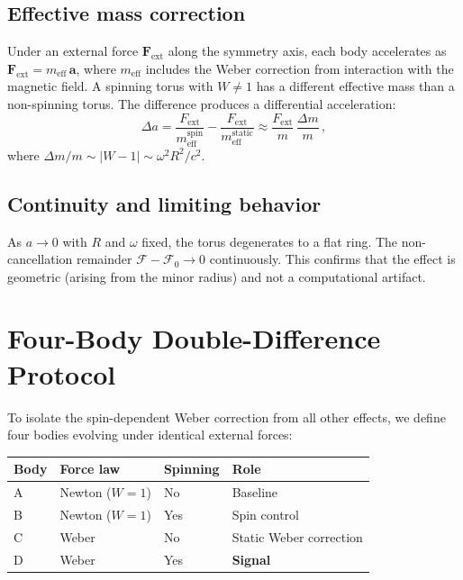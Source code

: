 \documentclass[12pt,preprint,amsmath,amssymb]{revtex4-2}
\begin{document}
\subsection{Effective mass correction}

Under an external force $\mathbf{F}_{\text{ext}}$ along the symmetry axis, each body
accelerates as $\mathbf{F}_{\text{ext}} = m_{\text{eff}}\,\mathbf{a}$, where
$m_{\text{eff}}$ includes the Weber correction from interaction with the magnetic field.
A spinning torus with $W \neq 1$ has a different effective mass than a non-spinning torus.
The difference produces a differential acceleration:
\begin{equation}
\label{eq:coupling}
\Delta a = \frac{F_{\text{ext}}}{m_{\text{eff}}^{\text{spin}}}
  - \frac{F_{\text{ext}}}{m_{\text{eff}}^{\text{static}}}
  \approx \frac{F_{\text{ext}}}{m}\,\frac{\Delta m}{m}\,,
\end{equation}
where $\Delta m / m \sim |W - 1| \sim \omega^2 R^2 / c^2$.

\subsection{Continuity and limiting behavior}

As $a \to 0$ with $R$ and $\omega$ fixed, the torus degenerates to a flat ring.
The non-cancellation remainder $\mathcal{F} - \mathcal{F}_0 \to 0$ continuously.
This confirms that the effect is geometric (arising from the minor radius) and not
a computational artifact.

\section{Four-Body Double-Difference Protocol}
\label{sec:protocol}

To isolate the spin-dependent Weber correction from all other effects, we define
four bodies evolving under identical external forces:

\begin{table}[h]
\centering
\begin{tabular}{@{}llll@{}}
\toprule
Body & Force law & Spinning & Role \\
\midrule
A & Newton ($W = 1$) & No & Baseline \\
B & Newton ($W = 1$) & Yes & Spin control \\
C & Weber              & No & Static Weber correction \\
D & Weber              & Yes & \textbf{Signal} \\
\bottomrule
\end{tabular}
\end{table}
\end{document}
